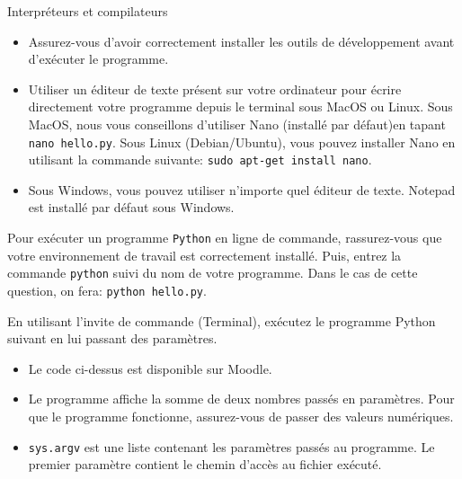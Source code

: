 \begin{section}{Interpréteurs et compilateurs}
\begin{conseil}
        \begin{itemize}
            \item Assurez-vous d'avoir correctement installer les outils de développement avant d'exécuter le programme.
            \item Utiliser un éditeur de texte présent sur votre ordinateur pour écrire directement votre programme depuis le terminal sous MacOS ou Linux. Sous MacOS, nous vous conseillons d'utiliser Nano (installé par défaut)en tapant \lstinline{nano hello.py}. Sous Linux (Debian/Ubuntu), vous pouvez installer Nano en utilisant la commande suivante: \lstinline{sudo apt-get install nano}.
            \item Sous Windows, vous pouvez utiliser n'importe quel éditeur de texte. Notepad est installé par défaut sous Windows.
        \end{itemize}
    \end{conseil}
    \begin{solution}
        Pour exécuter un programme \lstinline{Python} en ligne de commande, rassurez-vous que votre environnement de travail est correctement installé. Puis, entrez la commande \lstinline{python} suivi du nom de votre programme. 
        Dans le cas de cette question, on fera: \lstinline{python hello.py}.
    \end{solution}
    
    \begin{Exercice}[10 minutes]
        En utilisant l'invite de commande (Terminal), exécutez le programme Python suivant en lui passant des paramètres.

        
        
        \begin{conseil}
            \begin{itemize}
                \item Le code ci-dessus est disponible sur Moodle.
                \item Le programme affiche la somme de deux nombres passés en paramètres. Pour que le programme fonctionne, assurez-vous de passer des valeurs numériques.
                \item \lstinline{sys.argv} est une liste contenant les paramètres passés au programme. Le premier paramètre contient le chemin d'accès au fichier exécuté.
            \end{itemize}
        \end{conseil}


\end{Exercice}
\end{section}

